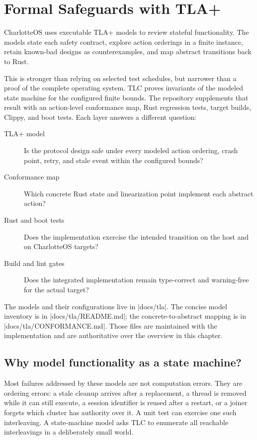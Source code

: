 \chapter{Formal Safeguards with TLA+}
\label{chap:formal-safeguards}
\newcommand{\tlbreak}[2]{\texttt{#1}\allowbreak\texttt{#2}}

CharlotteOS uses executable TLA+ models to review stateful functionality. The
models state each safety contract, explore action orderings in a finite instance,
retain known-bad designs as counterexamples, and map abstract transitions back to
Rust.

This is stronger than relying on selected test schedules, but narrower than a
proof of the complete operating system. TLC proves invariants of the modeled
state machine for the configured finite bounds. The repository supplements
that result with an action-level conformance map, Rust regression tests,
target builds, Clippy, and boot tests. Each layer answers a different question:

\begin{description}
    \item[TLA+ model] Is the protocol design safe under every modeled action
        ordering, crash point, retry, and stale event within the configured
        bounds?
    \item[Conformance map] Which concrete Rust state and linearization point
        implement each abstract action?
    \item[Rust and boot tests] Does the implementation exercise the intended
        transition on the host and on CharlotteOS targets?
    \item[Build and lint gates] Does the integrated implementation remain
        type-correct and warning-free for the actual target?
\end{description}

The models and their configurations live in \repodir|docs/tla|. The concise
model inventory is in \repofile|docs/tla/README.md|; the concrete-to-abstract
mapping is in \repofile|docs/tla/CONFORMANCE.md|. Those files are maintained
with the implementation and are authoritative over the overview in this
chapter.

\section{Why model functionality as a state machine?}

Most failures addressed by these models are not computation errors. They are
ordering errors: a stale cleanup arrives after a replacement, a thread is
removed while it can still execute, a session identifier is reused after a
restart, or a joiner forgets which cluster has authority over it. A unit test
can exercise one such interleaving. A state-machine model asks TLC to enumerate
all reachable interleavings in a deliberately small world.


